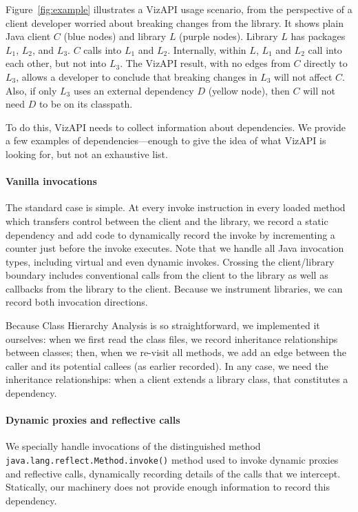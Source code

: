 Figure~\ref{fig:example} illustrates a VizAPI usage scenario, from the perspective of a client developer worried about breaking changes from the library. It shows plain Java client $C$ (blue nodes) and library $L$ (purple nodes). Library $L$ has packages $L_1$, $L_2$, and $L_3$. $C$ calls into $L_1$ and $L_2$. Internally, within $L$, $L_1$ and $L_2$ call into each other, but not into $L_3$. The VizAPI result, with no edges from $C$ directly to $L_3$, allows a developer to conclude that breaking changes in $L_3$ will not affect $C$. Also, if only $L_3$ uses an external dependency $D$ (yellow node), then $C$ will not need $D$ to be on its classpath.

To do this, VizAPI needs to collect information about dependencies. We provide a few examples of dependencies---enough to give the idea of what VizAPI is looking for, but not an exhaustive list.

\paragraph{Vanilla invocations}
The standard case is simple. At every invoke instruction in every
loaded method which transfers control between the client and the
library, we record a static dependency and add code to dynamically
record the invoke by incrementing a counter just before the invoke
executes. Note that we handle all Java invocation types, including
virtual and even dynamic invokes. Crossing the client/library boundary
includes conventional calls from the client to the library as well as
callbacks from the library to the client.  Because we instrument
libraries, we can record both invocation directions.

Because Class Hierarchy Analysis is so straightforward, we implemented
it ourselves: when we first read the class files, we record
inheritance relationships between classes; then, when we re-visit all
methods, we add an edge between the caller and its potential callees
(as earlier recorded).  In any case, we need the inheritance
relationships: when a client extends a library class, that constitutes
a dependency.

\paragraph{Dynamic proxies and reflective calls}
We specially handle invocations of the distinguished method 
\texttt{java.lang.reflect.Method.invoke()} method used to invoke dynamic proxies and reflective calls, dynamically recording
details of the calls that we intercept. Statically, our machinery
does not provide enough information to record this dependency.

